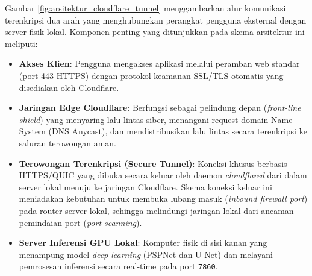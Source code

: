 \documentclass[12pt,a4paper,oneside]{book}
\begin{document}
Gambar \ref{fig:arsitektur_cloudflare_tunnel} menggambarkan alur komunikasi terenkripsi dua arah yang menghubungkan perangkat pengguna eksternal dengan server fisik lokal. Komponen penting yang ditunjukkan pada skema arsitektur ini meliputi:
\begin{itemize}
  \item \textbf{Akses Klien}: Pengguna mengakses aplikasi melalui peramban web standar (port 443 HTTPS) dengan protokol keamanan SSL/TLS otomatis yang disediakan oleh Cloudflare.
  \item \textbf{Jaringan Edge Cloudflare}: Berfungsi sebagai pelindung depan (\textit{front-line shield}) yang menyaring lalu lintas siber, menangani request domain Name System (DNS Anycast), dan mendistribusikan lalu lintas secara terenkripsi ke saluran terowongan aman.
  \item \textbf{Terowongan Terenkripsi (Secure Tunnel)}: Koneksi khusus berbasis HTTPS/QUIC yang dibuka secara keluar oleh daemon \textit{cloudflared} dari dalam server lokal menuju ke jaringan Cloudflare. Skema koneksi keluar ini meniadakan kebutuhan untuk membuka lubang masuk (\textit{inbound firewall port}) pada router server lokal, sehingga melindungi jaringan lokal dari ancaman pemindaian port (\textit{port scanning}).
  \item \textbf{Server Inferensi GPU Lokal}: Komputer fisik di sisi kanan yang menampung model \textit{deep learning} (PSPNet dan U-Net) dan melayani pemrosesan inferensi secara real-time pada port \texttt{7860}.
\end{itemize}
\end{document}
